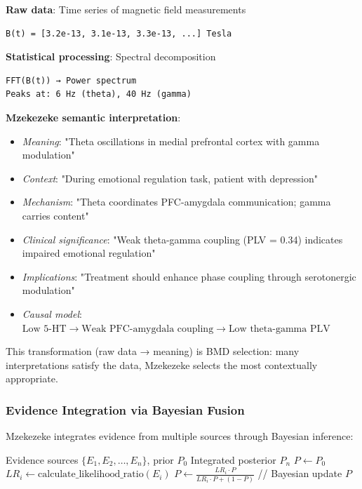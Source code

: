 \begin{example}
\textbf{Raw data}: Time series of magnetic field measurements
\begin{verbatim}
B(t) = [3.2e-13, 3.1e-13, 3.3e-13, ...] Tesla
\end{verbatim}

\textbf{Statistical processing}: Spectral decomposition
\begin{verbatim}
FFT(B(t)) → Power spectrum
Peaks at: 6 Hz (theta), 40 Hz (gamma)
\end{verbatim}

\textbf{Mzekezeke semantic interpretation}:
\begin{itemize}
\item \textit{Meaning}: "Theta oscillations in medial prefrontal cortex with gamma modulation"
\item \textit{Context}: "During emotional regulation task, patient with depression"
\item \textit{Mechanism}: "Theta coordinates PFC-amygdala communication; gamma carries content"
\item \textit{Clinical significance}: "Weak theta-gamma coupling (PLV = 0.34) indicates impaired emotional regulation"
\item \textit{Implications}: "Treatment should enhance phase coupling through serotonergic modulation"
\item \textit{Causal model}: $\text{Low 5-HT} \to \text{Weak PFC-amygdala coupling} \to \text{Low theta-gamma PLV}$
\end{itemize}

This transformation (raw data → meaning) is BMD selection: many interpretations satisfy the data, Mzekezeke selects the most contextually appropriate.
\end{example}

\subsubsection{Evidence Integration via Bayesian Fusion}

Mzekezeke integrates evidence from multiple sources through Bayesian inference:

\begin{algorithm}
\caption{Mzekezeke Evidence Integration}
\begin{algorithmic}
\REQUIRE Evidence sources $\{E_1, E_2, \ldots, E_n\}$, prior $P_0$
\ENSURE Integrated posterior $P_n$
\STATE $P \leftarrow P_0$
    \STATE $LR_i \leftarrow \text{calculate\_likelihood\_ratio}(E_i)$
    \STATE $P \leftarrow \frac{LR_i \cdot P}{LR_i \cdot P + (1 - P)}$ \qquad // Bayesian update
\ENDFOR
\STATE \RETURN $P$
\end{algorithmic}
\end{algorithm}

